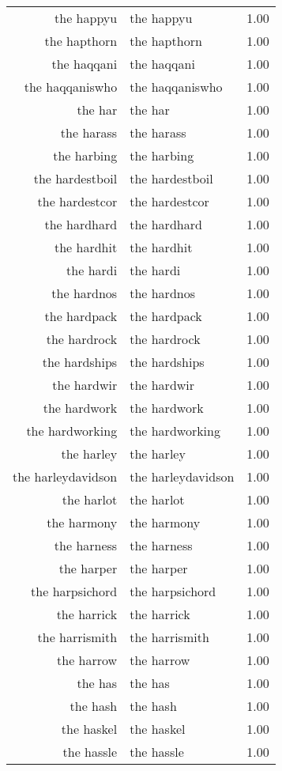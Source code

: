 \begin{table}[ht]
\begin{tabular}{rlr}
  the happyu & the happyu & 1.00 \\ 
  the hapthorn & the hapthorn & 1.00 \\ 
  the haqqani & the haqqani & 1.00 \\ 
  the haqqaniswho & the haqqaniswho & 1.00 \\ 
  the har & the har & 1.00 \\ 
  the harass & the harass & 1.00 \\ 
  the harbing & the harbing & 1.00 \\ 
  the hardestboil & the hardestboil & 1.00 \\ 
  the hardestcor & the hardestcor & 1.00 \\ 
  the hardhard & the hardhard & 1.00 \\ 
  the hardhit & the hardhit & 1.00 \\ 
  the hardi & the hardi & 1.00 \\ 
  the hardnos & the hardnos & 1.00 \\ 
  the hardpack & the hardpack & 1.00 \\ 
  the hardrock & the hardrock & 1.00 \\ 
  the hardships & the hardships & 1.00 \\ 
  the hardwir & the hardwir & 1.00 \\ 
  the hardwork & the hardwork & 1.00 \\ 
  the hardworking & the hardworking & 1.00 \\ 
  the harley & the harley & 1.00 \\ 
  the harleydavidson & the harleydavidson & 1.00 \\ 
  the harlot & the harlot & 1.00 \\ 
  the harmony & the harmony & 1.00 \\ 
  the harness & the harness & 1.00 \\ 
  the harper & the harper & 1.00 \\ 
  the harpsichord & the harpsichord & 1.00 \\ 
  the harrick & the harrick & 1.00 \\ 
  the harrismith & the harrismith & 1.00 \\ 
  the harrow & the harrow & 1.00 \\ 
  the has & the has & 1.00 \\ 
  the hash & the hash & 1.00 \\ 
  the haskel & the haskel & 1.00 \\ 
  the hassle & the hassle & 1.00 \\ 

\end{tabular}
\end{table}
